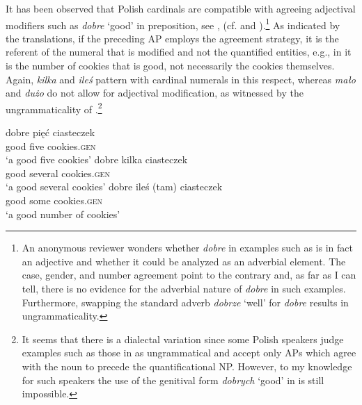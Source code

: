 \documentclass[output=paper,
]{langscibook}
\begin{document}
	It has been observed that Polish cardinals are compatible with agreeing adjectival modifiers such as \textit{dobre} `good' in preposition, see , (cf. \citealt{babby1987case} and \citealt{miechowicz-mathiasen2011syntax}).\footnote{An anonymous reviewer wonders whether \textit{dobre} in examples such as  is in fact an adjective and whether it could be analyzed as an adverbial element. The case, gender, and number agreement point to the contrary and, as far as I can tell, there is no evidence for the adverbial nature of \textit{dobre} in such examples. Furthermore, swapping the standard adverb \textit{dobrze} `well' for \textit{dobre} results in ungrammaticality.} As indicated by the translations, if the preceding AP employs the agreement strategy, it is the referent of the numeral that is modified and not the quantified entities, e.g., in  it is the number of cookies that is good, not necessarily the cookies themselves. Again, \textit{kilka} and \textit{ileś} pattern with cardinal numerals in this respect, whereas \textit{mało} and \textit{dużo} do not allow for adjectival modification, as witnessed by the ungrammaticality of .\footnote{It seems that there is a dialectal variation since some Polish speakers judge examples such as those in  as ungrammatical and accept only APs which agree with the noun to precede the quantificational NP. However, to my knowledge for such speakers the use of the genitival form \textit{dobrych} `good' in  is still impossible.}
	
	\ea \label{ex:adjectival-modifiers-agreement} \ea \gll dobre pięć ciasteczek\label{ex:adjectival-modifiers-agreement-cardinals}\\
	good five cookies.\textsc{gen}\\
	\glt `a good five cookies'
	\ex \gll dobre kilka ciasteczek\\
	good several cookies.\textsc{gen}\\
	\glt `a good several cookies'
	\ex \gll dobre {ileś (tam)} ciasteczek\\
	good some cookies.\textsc{gen}\\
	\glt `a good number of cookies'  
	\z
    \z

	\ea \label{ex:adjectival-modifiers-agreement-malo} 
	\z
    \z
\end{document}
